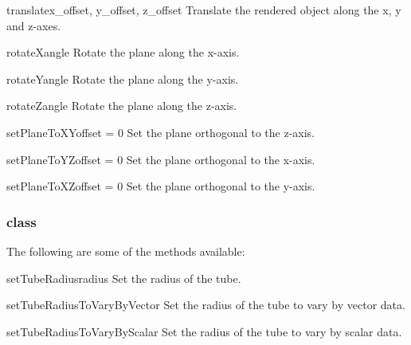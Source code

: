 \begin{methoddesc}[Transform]{translate}{x_offset, y_offset, z_offset}
Translate the rendered object along the x, y and z-axes.
\end{methoddesc}

\begin{methoddesc}[Transform]{rotateX}{angle}
Rotate the plane along the x-axis.
\end{methoddesc}

\begin{methoddesc}[Transform]{rotateY}{angle}
Rotate the plane along the y-axis.
\end{methoddesc}

\begin{methoddesc}[Transform]{rotateZ}{angle}
Rotate the plane along the z-axis.
\end{methoddesc}

\begin{methoddesc}[Transform]{setPlaneToXY}{offset = 0}
Set the plane orthogonal to the z-axis.
\end{methoddesc}

\begin{methoddesc}[Transform]{setPlaneToYZ}{offset = 0}
Set the plane orthogonal to the x-axis.
\end{methoddesc}

\begin{methoddesc}[Transform]{setPlaneToXZ}{offset = 0}
Set the plane orthogonal to the y-axis.
\end{methoddesc}

\subsubsection{\Tube class}

The following are some of the methods available:

\begin{methoddesc}[Tube]{setTubeRadius}{radius}
Set the radius of the tube.
\end{methoddesc}

\begin{methoddesc}[Tube]{setTubeRadiusToVaryByVector}{}
Set the radius of the tube to vary by vector data.
\end{methoddesc}

\begin{methoddesc}[Tube]{setTubeRadiusToVaryByScalar}{}
Set the radius of the tube to vary by scalar data.
\end{methoddesc}

